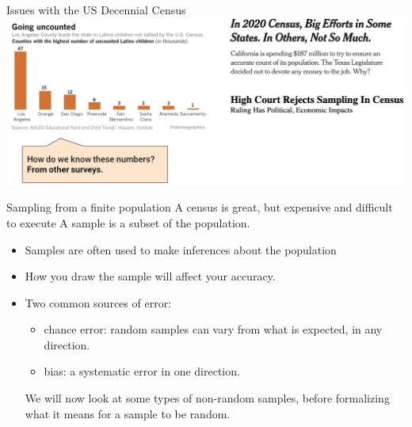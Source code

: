 \documentclass[aspectratio=169]{../latex_main/tntbeamer}  %
\begin{document}
	
	\begin{frame}{Issues with the US Decennial Census}
	    \includegraphics[scale=.4]{Bild8}
	\end{frame}
	
	
	
	
	\begin{frame}{Sampling from a finite population}
	    A census is great, but expensive and difficult to execute
	    \bigskip
	    A sample is a subset of the population.
        \begin{itemize}
            \item Samples are often used to make inferences about the population
            \item How you draw the sample will affect your accuracy.
            \item Two common sources of error:
            \begin{itemize}
                \item chance error: random samples can vary from what is expected, in any direction.
                \item bias: a systematic error in one direction.
            \end{itemize}
               \bigskip
               \bigskip
               We will now look at some types of non-random samples, before formalizing what it means for a sample to be random.

        \end{itemize}
	    
	\end{frame}
	
\end{document}
